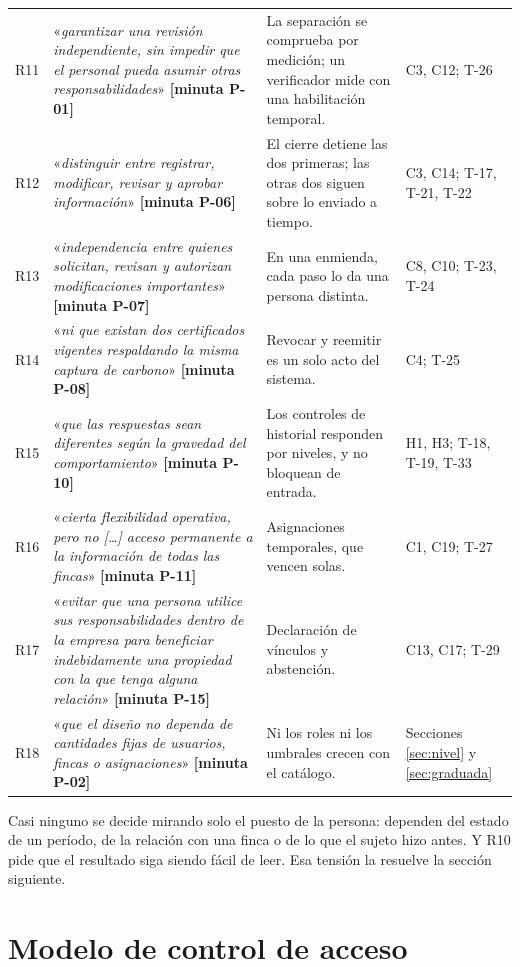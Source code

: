 \documentclass[11pt,letterpaper]{article}
\newcommand{\resp}[1]{\textrm{\footnotesize\bfseries [minuta #1]}}
\newcommand{\carta}[1]{«\emph{#1}»}
\begin{document}
{\begin{longtable}{@{}L{0.7cm} L{6.0cm} L{5.4cm} L{3.3cm}@{}}
R11 & \carta{garantizar una revisión independiente, sin impedir que el personal pueda asumir otras responsabilidades} \resp{P-01} & La separación se comprueba por medición; un verificador mide con una habilitación temporal. & C3, C12; T-26 \\
R12 & \carta{distinguir entre registrar, modificar, revisar y aprobar información} \resp{P-06} & El cierre detiene las dos primeras; las otras dos siguen sobre lo enviado a tiempo. & C3, C14; T-17, T-21, T-22 \\
R13 & \carta{independencia entre quienes solicitan, revisan y autorizan modificaciones importantes} \resp{P-07} & En una enmienda, cada paso lo da una persona distinta. & C8, C10; T-23, T-24 \\
R14 & \carta{ni que existan dos certificados vigentes respaldando la misma captura de carbono} \resp{P-08} & Revocar y reemitir es un solo acto del sistema. & C4; T-25 \\
R15 & \carta{que las respuestas sean diferentes según la gravedad del comportamiento} \resp{P-10} & Los controles de historial responden por niveles, y no bloquean de entrada. & H1, H3; T-18, T-19, T-33 \\
R16 & \carta{cierta flexibilidad operativa, pero no [\ldots] acceso permanente a la información de todas las fincas} \resp{P-11} & Asignaciones temporales, que vencen solas. & C1, C19; T-27 \\
R17 & \carta{evitar que una persona utilice sus responsabilidades dentro de la empresa para beneficiar indebidamente una propiedad con la que tenga alguna relación} \resp{P-15} & Declaración de vínculos y abstención. & C13, C17; T-29 \\
R18 & \carta{que el diseño no dependa de cantidades fijas de usuarios, fincas o asignaciones} \resp{P-02} & Ni los roles ni los umbrales crecen con el catálogo. & Secciones \ref{sec:nivel} y \ref{sec:graduada} \\
\end{longtable}
}

Casi ninguno se decide mirando solo el puesto de la persona: dependen del estado de un período, de la
relación con una finca o de lo que el sujeto hizo antes. Y R10 pide que el resultado siga siendo fácil
de leer. Esa tensión la resuelve la sección siguiente.

\section{Modelo de control de acceso}
\label{sec:modelo}
\end{document}
